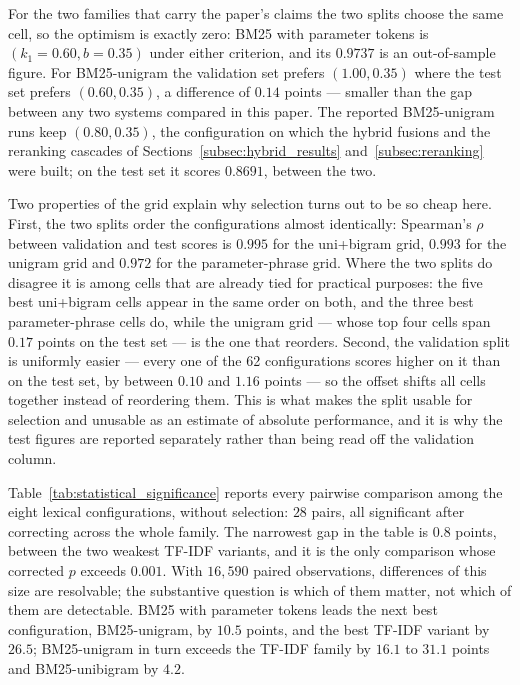 \documentclass[preprint,12pt]{elsarticle}
\begin{document}


For the two families that carry the paper's claims the two splits choose the same cell, so the optimism is exactly zero: BM25 with parameter tokens is $(k_1{=}0.60, b{=}0.35)$ under either criterion, and its $0.9737$ is an out-of-sample figure. For BM25-unigram the validation set prefers $(1.00, 0.35)$ where the test set prefers $(0.60, 0.35)$, a difference of $0.14$ points --- smaller than the gap between any two systems compared in this paper. The reported BM25-unigram runs keep $(0.80, 0.35)$, the configuration on which the hybrid fusions and the reranking cascades of Sections~\ref{subsec:hybrid_results} and~\ref{subsec:reranking} were built; on the test set it scores $0.8691$, between the two.

Two properties of the grid explain why selection turns out to be so cheap here. First, the two splits order the configurations almost identically: Spearman's $\rho$ between validation and test scores is $0.995$ for the uni+bigram grid, $0.993$ for the unigram grid and $0.972$ for the parameter-phrase grid. Where the two splits do disagree it is among cells that are already tied for practical purposes: the five best uni+bigram cells appear in the same order on both, and the three best parameter-phrase cells do, while the unigram grid --- whose top four cells span $0.17$ points on the test set --- is the one that reorders. Second, the validation split is uniformly easier --- every one of the 62 configurations scores higher on it than on the test set, by between $0.10$ and $1.16$ points --- so the offset shifts all cells together instead of reordering them. This is what makes the split usable for selection and unusable as an estimate of absolute performance, and it is why the test figures are reported separately rather than being read off the validation column.

Table~\ref{tab:statistical_significance} reports every pairwise comparison among the eight lexical configurations, without selection: $28$ pairs, all significant after correcting across the whole family. The narrowest gap in the table is $0.8$ points, between the two weakest TF-IDF variants, and it is the only comparison whose corrected $p$ exceeds $0.001$. With $16{,}590$ paired observations, differences of this size are resolvable; the substantive question is which of them matter, not which of them are detectable. BM25 with parameter tokens leads the next best configuration, BM25-unigram, by $10.5$ points, and the best TF-IDF variant by $26.5$; BM25-unigram in turn exceeds the TF-IDF family by $16.1$ to $31.1$ points and BM25-unibigram by $4.2$.
\end{document}
